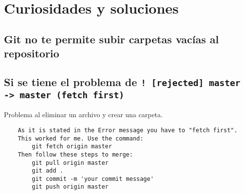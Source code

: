 \documentclass{article}
\theoremstyle{mytheoremstyle}
\theoremstyle{mytheoremstyle}
\theoremstyle{myproblemstyle}
\begin{document}
\section{Curiosidades y soluciones}
\subsection{Git no te permite subir carpetas vacías al repositorio}
\subsection{Si se tiene el problema de \texttt{! [rejected] master -> master (fetch first)} }
Problema al eliminar un archivo y crear una carpeta.
\begin{verbatim}
    As it is stated in the Error message you have to "fetch first".
    This worked for me. Use the command:
        git fetch origin master
    Then follow these steps to merge:
        git pull origin master
        git add .
        git commit -m 'your commit message'
        git push origin master
\end{verbatim}
\end{document}
